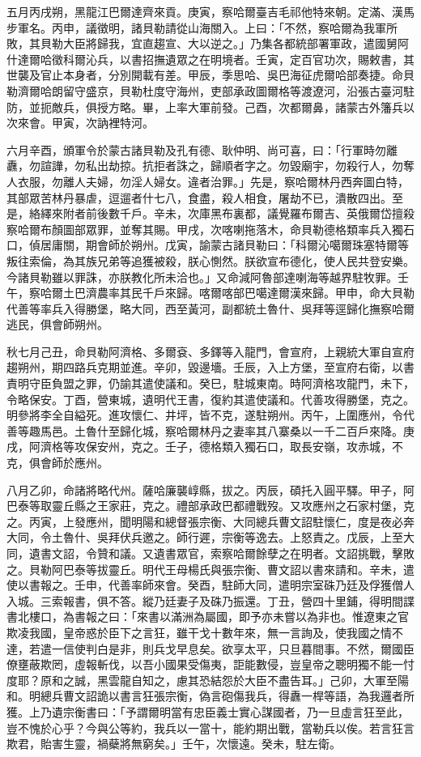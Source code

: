 \begin{pinyinscope}
五月丙戌朔，黑龍江巴爾達齊來貢。庚寅，察哈爾臺吉毛祁他特來朝。定滿、漢馬步軍名。丙申，議徵明，諸貝勒請從山海關入。上曰：「不然，察哈爾為我軍所敗，其貝勒大臣將歸我，宜直趨宣、大以逆之。」乃集各都統部署軍政，遣國舅阿什達爾哈徵科爾沁兵，以書招撫遺眾之在明境者。壬寅，定百官功次，賜敕書，其世襲及官止本身者，分別開載有差。甲辰，季思哈、吳巴海征虎爾哈部奏捷。命貝勒濟爾哈朗留守盛京，貝勒杜度守海州，吏部承政圖爾格等渡遼河，沿張古臺河駐防，並扼敵兵，俱授方略。畢，上率大軍前發。己酉，次都爾鼻，諸蒙古外籓兵以次來會。甲寅，次訥裡特河。

六月辛酉，頒軍令於蒙古諸貝勒及孔有德、耿仲明、尚可喜，曰：「行軍時勿離纛，勿諠譁，勿私出劫掠。抗拒者誅之，歸順者字之。勿毀廟宇，勿殺行人，勿奪人衣服，勿離人夫婦，勿淫人婦女。違者治罪。」先是，察哈爾林丹西奔圖白特，其部眾苦林丹暴虐，逗遛者什七八，食盡，殺人相食，屠劫不已，潰散四出。至是，絡繹來附者前後數千戶。辛未，次庫黑布裏都，議覺羅布爾吉、英俄爾岱擅殺察哈爾布顏圖部眾罪，並奪其賜。甲戌，次喀喇拖落木，命貝勒德格類率兵入獨石口，偵居庸關，期會師於朔州。戊寅，諭蒙古諸貝勒曰：「科爾沁噶爾珠塞特爾等叛往索倫，為其族兄弟等追獲被殺，朕心惻然。朕欲宣布德化，使人民共登安樂。今諸貝勒雖以罪誅，亦朕教化所未洽也。」又命減阿魯部達喇海等越界駐牧罪。壬午，察哈爾土巴濟農率其民千戶來歸。喀爾喀部巴噶達爾漢來歸。甲申，命大貝勒代善等率兵入得勝堡，略大同，西至黃河，副都統土魯什、吳拜等逕歸化撫察哈爾逃民，俱會師朔州。

秋七月己丑，命貝勒阿濟格、多爾袞、多鐸等入龍門，會宣府，上親統大軍自宣府趨朔州，期四路兵克期並進。辛卯，毀邊墻。壬辰，入上方堡，至宣府右衛，以書責明守臣負盟之罪，仍諭其遣使議和。癸巳，駐城東南。時阿濟格攻龍門，未下，令略保安。丁酉，營東城，遺明代王書，復約其遣使議和。代善攻得勝堡，克之。明參將李全自縊死。進攻懷仁、井坪，皆不克，遂駐朔州。丙午，上圍應州，令代善等趣馬邑。土魯什至歸化城，察哈爾林丹之妻率其八寨桑以一千二百戶來降。庚戌，阿濟格等攻保安州，克之。壬子，德格類入獨石口，取長安嶺，攻赤城，不克，俱會師於應州。

八月乙卯，命諸將略代州。薩哈廉襲崞縣，拔之。丙辰，碩托入圓平驛。甲子，阿巴泰等取靈丘縣之王家莊，克之。禮部承政巴都禮戰歿。又攻應州之石家村堡，克之。丙寅，上發應州，聞明陽和總督張宗衡、大同總兵曹文詔駐懷仁，度是夜必奔大同，令土魯什、吳拜伏兵邀之。師行遲，宗衡等逸去。上怒責之。戊辰，上至大同，遺書文詔，令贊和議。又遺書眾官，索察哈爾餘孽之在明者。文詔挑戰，擊敗之。貝勒阿巴泰等拔靈丘。明代王母楊氏與張宗衡、曹文詔以書來請和。辛未，遣使以書報之。壬申，代善率師來會。癸酉，駐師大同，遣明宗室硃乃廷及俘獲僧人入城。三索報書，俱不答。縱乃廷妻子及硃乃振還。丁丑，營四十里鋪，得明間諜書北樓口，為書報之曰：「來書以滿洲為屬國，即予亦未嘗以為非也。惟遼東之官欺凌我國，皇帝惑於臣下之言狂，雖干戈十數年來，無一言詢及，使我國之情不達，若遣一信使判白是非，則兵戈早息矣。欲享太平，只旦暮間事。不然，爾國臣僚壅蔽欺罔，虛報斬伐，以吾小國果受傷夷，詎能數侵，豈皇帝之聰明獨不能一忖度耶？原和之誠，黑雲龍自知之，慮其恐結怨於大臣不盡告耳。」己卯，大軍至陽和。明總兵曹文詔詭以書言狂張宗衡，偽言砲傷我兵，得纛一桿等語，為我邏者所獲。上乃遺宗衡書曰：「予謂爾明當有忠臣義士實心謀國者，乃一旦虛言狂至此，豈不愧於心乎？今與公等約，我兵以一當十，能約期出戰，當勒兵以俟。若言狂言欺君，貽害生靈，禍蘗將無窮矣。」壬午，次懷遠。癸未，駐左衛。


\end{pinyinscope}
